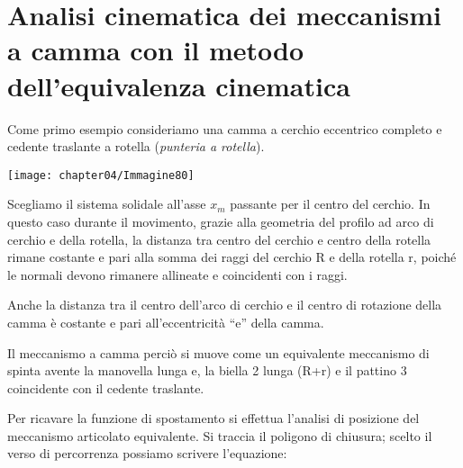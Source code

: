 		\section{Analisi cinematica dei meccanismi a camma con il metodo dell'equivalenza cinematica}
		
		Come primo esempio consideriamo una camma a cerchio eccentrico completo e cedente traslante a rotella (\emph{punteria a rotella}).
		

		\begin{center}
		\texttt{[image: chapter04/Immagine80]}
		\end{center}
		
		Scegliamo il sistema solidale all'asse $x_m$ passante per il centro del cerchio. In questo caso durante il movimento, grazie alla geometria del profilo ad arco di cerchio e della rotella, la distanza tra centro del cerchio e centro della rotella rimane costante e pari alla somma dei raggi del cerchio R e della rotella r, poiché le normali devono rimanere allineate e coincidenti con i raggi.
		
		Anche la distanza tra il centro dell'arco di cerchio e il centro di rotazione della camma è costante e pari all'eccentricità ``e'' della camma.
		
		Il meccanismo a camma perciò si muove come un equivalente meccanismo di spinta avente la manovella lunga e, la biella 2 lunga (R+r) e il pattino 3 coincidente con il cedente traslante.
		
		Per ricavare la funzione di spostamento si effettua l'analisi di posizione del meccanismo articolato equivalente. Si traccia il poligono di chiusura; scelto il verso di percorrenza possiamo scrivere l'equazione:
		
